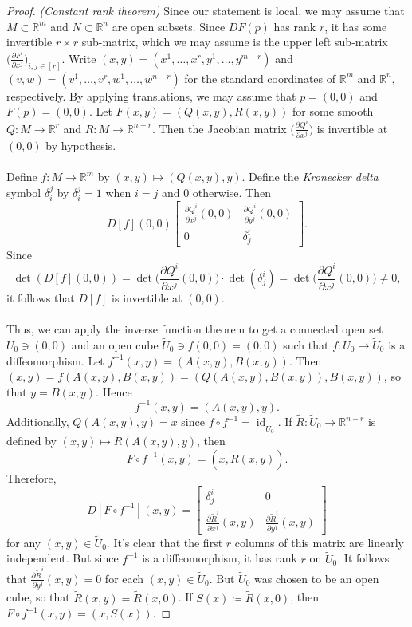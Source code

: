 \documentclass[10pt,letterpaper,cm]{nupset}
\theoremstyle{definition}
\newcommand{\R}{\mathbb R}
\newcommand{\1}{\mathbf{1}}
\newcommand{\0}{\vec 0}
\DeclareMathOperator{\id}{id}
\begin{document}
\begin{proof}{\textit{(Constant rank theorem)}}
Since our statement is local, we may assume that $M\subset \R^m$ and $N\subset \R^n$ are open subsets. Since $DF(p)$ has rank $r$, it has some invertible $r\times r$ sub-matrix, which we may assume is the upper left sub-matrix $\big(\frac{\partial{F^i}}{\partial{x^j}}\big )_{i,j\in [r]}$. Write $(x,y) = (x^1, \ldots, x^r, y^1, \ldots, y^{m-r})$ and $(v,w) = (v^1, \ldots, v^r, w^1, \ldots, w^{n-r})$ for the standard coordinates of $\R^m$ and $\R^n$, respectively. By applying translations, we may assume that $p=(0,0)$ and $F(p)= (0,0)$. Let $F(x,y)= (Q(x,y), R(x,y))$ for some smooth $Q: M \to \R^r$ and $R: M \to \R^{n-r}$. Then the Jacobian matrix $\big (\frac{\partial{Q^i}}{\partial{x^j}} \big )$ is invertible at $(0,0)$ by hypothesis. 
\\ \\
Define $f : M \to \R^m$ by $(x,y) \mapsto (Q(x,y), y)$. Define the \textit{Kronecker delta} symbol $\delta_i^j$ by $\delta_i^j = 1$ when $i=j$ and $0$ otherwise.  Then $$D[f](0,0) \begin{bmatrix} \frac{\partial{Q^i}}{\partial{x^j}}(0,0) & \frac{\partial{Q^i}}{\partial{y^j}}(0,0) \\ 0 & \delta^i_j     \end{bmatrix}   .$$ Since $$\det(D[f](0,0)) = \det \big ( \frac{\partial{Q^i}}{\partial{x^j}}(0,0) \big) \cdot \det(\delta^i_j) = \det \big ( \frac{\partial{Q^i}}{\partial{x^j}}(0,0)  \big) \ne 0,$$ it follows that $D[f]$ is invertible at $(0,0)$. 
\\ \\Thus, we can apply the inverse function theorem to get a connected open set $U_0 \ni (0,0)$ and an open cube $\widetilde{U}_0 \ni f(0,0) = (0,0)$ such that $f: U_0 \to \widetilde{U}_0$ is a diffeomorphism.  Let $f^{-1}(x,y) =(A(x,y), B(x,y))$. Then $(x,y) = f(A(x,y), B(x,y)) = (Q(A(x,y), B(x,y)), B(x,y))$, so that $y = B(x,y)$. Hence $$f^{-1}(x,y) = (A(x,y), y).$$ Additionally, $Q(A(x,y), y)=x$ since $f\circ f^{-1} = \id_{\widetilde{U}_0}$. If $\widetilde{R} : \widetilde{U}_0 \to \R^{n-r}$ is defined by $(x,y) \mapsto R(A(x,y), y)$, then $$F\circ f^{-1}(x,y) = (x, \widetilde{R}(x,y)).$$ Therefore, $$D[F\circ f^{-1}](x,y)  =  \begin{bmatrix}    \delta^i_j & 0 \\ 
\frac{\partial{\widetilde{R}^i}}{\partial{x^j}}(x,y) & \frac{\partial{\widetilde{R}^i}}{\partial{y^j}}(x,y)    \end{bmatrix} $$ for any $(x,y) \in \widetilde{U}_0$. It's clear that the first $r$ columns of this matrix are linearly independent. But since $f^{-1}$ is a diffeomorphism, it has rank $r$ on $\widetilde{U}_0$. It follows that $ \frac{\partial{\widetilde{R}^i}}{\partial{y^j}}(x,y) =0$ for each $(x,y) \in \widetilde{U}_0$. But $\widetilde{U}_0$ was chosen to be an open cube, so that $\widetilde{R}(x,y) = \widetilde{R}(x,0)$. If $S(x) \coloneqq \widetilde{R}(x,0)$, then $F \circ f^{-1}(x,y) = (x, S(x))$. 

\end{proof}
\end{document}

